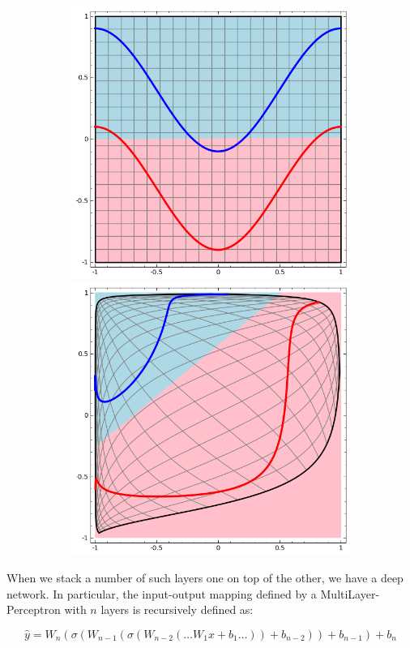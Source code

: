 \documentclass[../main.tex]{subfiles}
\begin{document}
    \begin{figure}[h!]
        \centering
        \begin{subfigure}{\linewidth}
            \centering
        	\includegraphics[width=.5\linewidth]{img/non-linearly-separable.png}\label{fig:nonlinearsep}\hfill
        	\includegraphics[width=.5\linewidth]{img/linearly-separable.png}\label{fig:linearsep}
        \end{subfigure}
        \label{fig:linear-layer-viz}
	\end{figure}


    When we stack a number of such layers one on top of the other, we have a deep network. In particular, the input-output mapping defined by
    a MultiLayer-Perceptron with $n$ layers is recursively defined as:

    \begin{equation}
        \hat{y} = W_{n}(\sigma(W_{n-1}(\sigma(W_{n-2}(\ldots W_{1} x + b_{1} \ldots)) + b_{n-2})) + b_{n-1}) + b_{n} 
    \end{equation}
\end{document}
